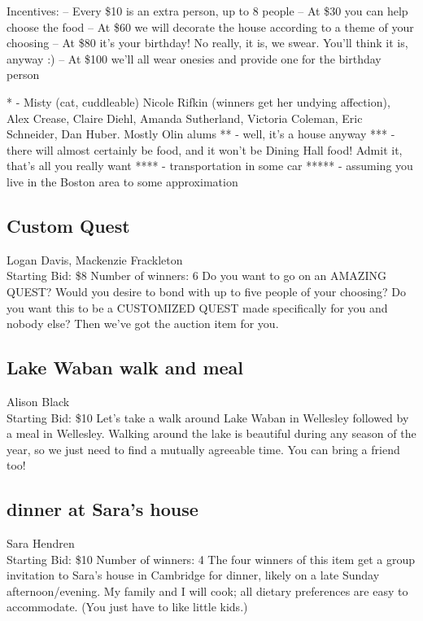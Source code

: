 \documentclass[11pt]{article}
\begin{document}
Incentives:
-- Every \$10 is an extra person, up to 8 people
-- At \$30 you can help choose the food
-- At \$60 we will decorate the house according to a theme of your choosing
-- At \$80 it's your birthday! No really, it is, we swear. You'll think it is, anyway :)
-- At \$100 we'll all wear onesies and provide one for the birthday person

* - Misty (cat, cuddleable) Nicole Rifkin (winners get her undying affection), Alex Crease, Claire Diehl, Amanda Sutherland, Victoria Coleman, Eric Schneider, Dan Huber. Mostly Olin alums
** - well, it's a house anyway
*** - there will almost certainly be food, and it won't be Dining Hall food! Admit it, that's all you really want
**** - transportation in some car
***** - assuming you live in the Boston area to some approximation
\subsection{Custom Quest}
Logan Davis, Mackenzie Frackleton
\\
Starting Bid: \$8
\newline
Number of winners: 6
\newline
Do you want to go on an AMAZING QUEST? Would you desire to bond with up to five people of your choosing? Do you want this to be a CUSTOMIZED QUEST made specifically for you and nobody else? Then we've got the auction item for you.
\subsection{Lake Waban walk and meal}
Alison Black
\\
Starting Bid: \$10
\newline
Let's take a walk around Lake Waban in Wellesley followed by a meal in Wellesley.  Walking around the lake is beautiful during any season of the year, so we just need to find a mutually agreeable time.  You can bring a friend too!
\subsection{dinner at Sara's house}
Sara Hendren
\\
Starting Bid: \$10
\newline
Number of winners: 4
\newline
The four winners of this item get a group invitation to Sara's house in Cambridge for dinner, likely on a late Sunday afternoon/evening. My family and I will cook; all dietary preferences are easy to accommodate. (You just have to like little kids.)
\end{document}
